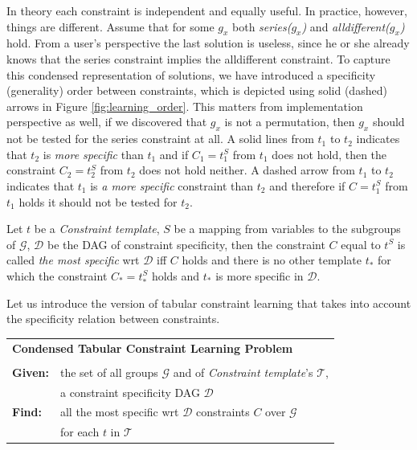\documentclass{ecai}
\newcommand{\constraints}{\ensuremath{\mathcal{T}}\xspace}
\newcommand{\format}[1]{\textit{#1}\xspace}
\newcommand{\template}{\format{Constraint template}}
\newcommand{\dependencies}{\ensuremath{\mathcal{D}}\xspace}
\newcommand{\groups}{\ensuremath{\mathcal{G}}\xspace}
\begin{document}
  In theory each constraint is independent and equally useful. In practice, however, things are different. Assume that for some $g_x$ both \textit{series($g_x$)} and \textit{alldifferent($g_x$)} hold. From a user's perspective the last solution is useless, since he or she already knows that the series constraint implies the alldifferent constraint. To capture this condensed representation \cite{condensed} of solutions, we have introduced a specificity (generality) order between constraints, which is depicted using solid (dashed) arrows in Figure \ref{fig:learning_order}. This matters from implementation perspective as well, if we discovered that $g_x$ is not a permutation, then $g_x$ should not be tested for the series constraint at all. A solid lines from $t_1$ to $t_2$ indicates that $t_2$ is \textit{more specific} than $t_1$ and if $C_1=t_1^S$ from $t_1$ does not hold, then the constraint $C_2=t_2^S$ from $t_2$ does not hold neither. A dashed arrow from $t_1$ to $t_2$ indicates that $t_1$ is \textit{a more specific} constraint than $t_2$ and therefore if $C=t_1^S$ from $t_1$ holds it should not be tested for $t_2$.


Let $t$ be a \template, $S$ be a mapping from variables to the subgroups of \groups, \dependencies be the DAG of constraint specificity, then the constraint $C$ equal to $t^S$ is called  \textit{the most specific} wrt \dependencies iff $C$ holds and there is no other template $t_{*}$ for which the constraint $C_{*}=t_{*}^S$ holds and $t_{*}$ is more specific in \dependencies.


Let us introduce the version of tabular constraint learning that takes into account the specificity relation between constraints.

\begin{minipage}[c]{14em}
  \vspace{5pt}
  \begin{tabular}{ll}
    \multicolumn{2}{l}{{\textbf{Condensed Tabular Constraint Learning Problem}}}\\
    \vspace{-4pt}
    &\\
    \textbf{Given:}& the set of all groups $\groups$ and of \template's $\constraints$,\\
    & a constraint specificity DAG \dependencies \\
    \textbf{Find:}& all the most specific wrt \dependencies constraints $C$ over \groups\\
    & for each $t$ in \constraints \\
  \end{tabular}
  \vspace{6pt}
\end{minipage}
\end{document}
